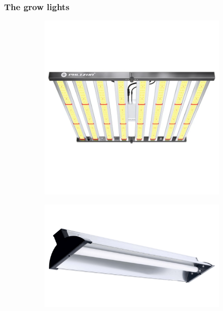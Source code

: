 \documentclass[
    12pt,
    aspectratio=1610,
    b,
    bibliography=../bibliography.bib,
    link-citations]{beamer}
\begin{document}
    \begin{frame}
        \frametitle{The grow lights}
        \begin{figure}
            \begin{subfigure}[t]{.4\textwidth}
                \includegraphics[width=\linewidth]{PHLIZON_PH-FD8-E}
            \end{subfigure}
            \hfill
            \begin{subfigure}[t]{.4\textwidth}
                \includegraphics[width=\linewidth]{LuxElite_PlantUV}
            \end{subfigure}
        \end{figure}
    \end{frame}
\end{document}
